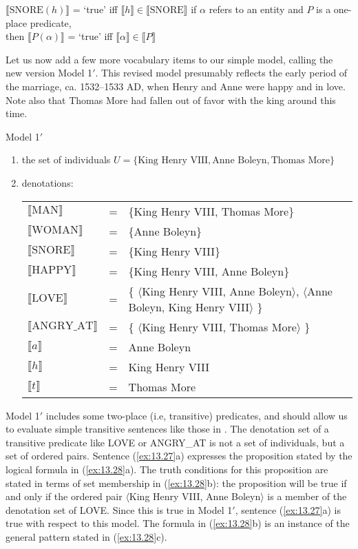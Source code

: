 \ea \label{ex:13.25}
\ea  $\llbracket\text{SNORE}(h)\rrbracket$  = ‘true’  iff  $\llbracket h\rrbracket \in \llbracket\text{SNORE}\rrbracket$ 
\ex  if $\alpha$ refers to an entity and $P$ is a one-place predicate,\\
  then  $\llbracket P(\alpha)\rrbracket$  = ‘true’  iff  $\llbracket \alpha \rrbracket \in \llbracket P\rrbracket$ 
\z \z


Let us now add a few more vocabulary items to our simple model, calling the new version Model 1$'$. This revised model presumably reflects the early period of the marriage, ca. 1532--1533 AD, when Henry and Anne were happy and in love. Note also that Thomas More had fallen out of favor with the king around this time.


\ea \label{ex:13.26} Model 1$'$\\
\begin{enumerate}[label=\roman*.]
\item the set of individuals $U = \{\text{King Henry VIII}, \text{Anne Boleyn}, \text{Thomas More}\}$
\item denotations:\smallskip\\
\begin{tabularx}{\linewidth}{@{}l@{~}c@{~}Q@{}}
$\llbracket\text{MAN}\rrbracket$        & = & \{King Henry VIII, Thomas More\}\\
$\llbracket\text{WOMAN}\rrbracket$      & = & \{Anne Boleyn\}\\
$\llbracket\text{SNORE}\rrbracket$      & = & \{King Henry VIII\}\\
$\llbracket\text{HAPPY}\rrbracket$      & = & \{King Henry VIII, Anne Boleyn\}\\
$\llbracket\text{LOVE}\rrbracket$       & = & \{ $\langle$King Henry VIII, Anne Boleyn$\rangle$, $\langle$Anne Boleyn, King Henry VIII$\rangle$ \}\\
$\llbracket\text{ANGRY\_AT}\rrbracket$  & = & \{ $\langle$King Henry VIII, Thomas More$\rangle$ \}\\
$\llbracket a\rrbracket$          & = & Anne Boleyn\\
$\llbracket h\rrbracket$          & = & King Henry VIII\\
$\llbracket t\rrbracket$          & = & Thomas More
\end{tabularx}
\end{enumerate}
\z

Model 1$'$ includes some two-place (i.e, transitive) predicates, and should allow us to evaluate simple transitive sentences like those in . The denotation set of a transitive predicate like LOVE or ANGRY\_AT is not a set of individuals, but a set of ordered pairs. Sentence (\ref{ex:13.27}a) expresses the proposition stated by the logical formula in (\ref{ex:13.28}a). The truth conditions for this proposition are stated in terms of set membership in (\ref{ex:13.28}b): the proposition will be true if and only if the ordered pair $\langle$King Henry VIII, Anne Boleyn$\rangle$ is a member of the denotation set of LOVE. Since this is true in Model 1$'$, sentence (\ref{ex:13.27}a) is true with respect to this model. The formula in (\ref{ex:13.28}b) is an instance of the general pattern stated in (\ref{ex:13.28}c).


